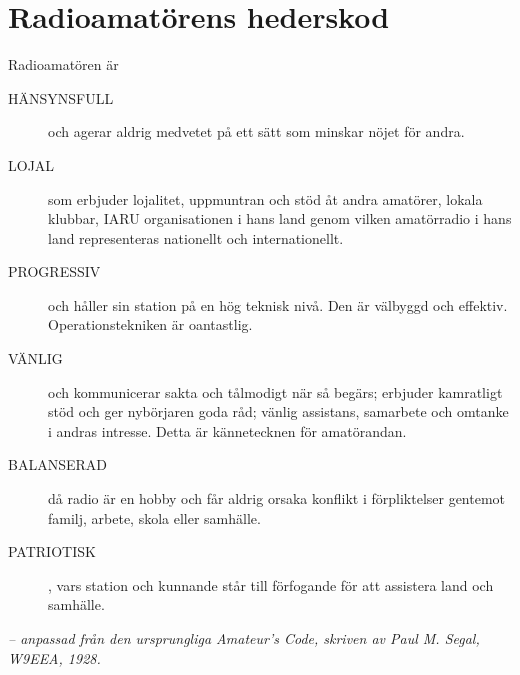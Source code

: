 \newpage %
\section[Hederskod]{Radioamatörens hederskod}

Radioamatören är

\begin{description}
  \item[HÄNSYNSFULL] och agerar aldrig medvetet på ett sätt som minskar nöjet
    för andra.

  \item[LOJAL] som erbjuder lojalitet, uppmuntran och stöd åt andra amatörer,
    lokala klubbar, IARU organisationen i hans land genom vilken amatörradio i
	hans land representeras nationellt och internationellt.

  \item[PROGRESSIV] och håller sin station på en hög teknisk nivå. Den är
    välbyggd och effektiv. Operationstekniken är oantastlig.

  \item[VÄNLIG] och kommunicerar sakta och tålmodigt när så begärs; erbjuder
    kamratligt stöd och ger nybörjaren goda råd; vänlig assistans, samarbete och
    omtanke i andras intresse. Detta är kännetecknen för amatörandan.

  \item[BALANSERAD] då radio är en hobby och får aldrig orsaka konflikt i
    förpliktelser gentemot familj, arbete, skola eller samhälle.

  \item[PATRIOTISK], vars station och kunnande står till förfogande för att
    assistera land och samhälle.
\end{description}

\emph{-- anpassad från den ursprungliga Amateur's Code, skriven av Paul M. Segal, W9EEA, 1928.}
